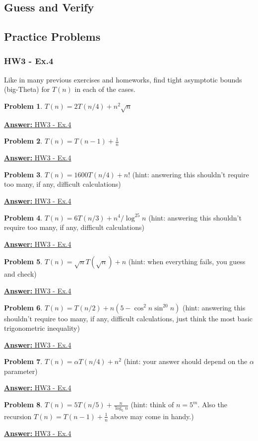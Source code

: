 \documentclass[12pt]{article}
\theoremstyle{definition}
\newtheorem{practiceproblem}{Problem}[section]
\def\scratchwork{\vspace*{15em}} %
\def\ghbase{https://github.com/zacktraczyk/CSE102-Midterm-Study-Guide/blob/main/hw\%20answers/}
\newenvironment{problem}[2]
{
	\def\linktext{#1}
	\def\linkdest{\ghbase#2}
	\noindent \begin{minipage}{\textwidth}
		\begin{practiceproblem}
}
{	
		\end{practiceproblem}
		\scratchwork

		\href{\linkdest}{\textbf{Answer:} \linktext}
	\end{minipage}
}
\def\psetthree{vaggos\_W\_24\_CSE102\_01\_PSET\_3\_Solutions.pdf}
\begin{document}
	\subsection{Guess and Verify}

	\subsection{Practice Problems}

	\subsubsection{HW3 - Ex.4}

	Like in many previous exercises and homeworks, find tight asymptotic bounds
	(big-Theta) for $T(n)$ in each of the cases.

	\begin{problem}{HW3 - Ex.4}{\psetthree}
		$T(n)=2T(n/4)+n^2\sqrt n$
	\end{problem}
	\begin{problem}{HW3 - Ex.4}{\psetthree}
		$T(n)=T(n-1)+\frac1n$
	\end{problem}
	\begin{problem}{HW3 - Ex.4}{\psetthree}
		$T(n)=1600T(n/4)+n!$ (hint: answering this shouldn't require too many,
		if any, difficult calculations)
	\end{problem}
	\begin{problem}{HW3 - Ex.4}{\psetthree}
		$T(n)=6T(n/3)+n^4/\log^{25} n$ (hint: answering this shouldn't require
		too many, if any, difficult calculations)
	\end{problem}
	\begin{problem}{HW3 - Ex.4}{\psetthree}
		$T(n)=\sqrt n T(\sqrt{n}) + n$ (hint: when everything fails, you guess
		and check)
	\end{problem}
	\begin{problem}{HW3 - Ex.4}{\psetthree}
		$T(n)=T(n/2)+n(5-\cos^2n\sin^{20}n)$ (hint: answering this shouldn't
		require too many, if any, difficult calculations, just think the most
		basic trigonometric inequality)
	\end{problem}
	\begin{problem}{HW3 - Ex.4}{\psetthree}
		$T(n)=\alpha T(n/4)+n^2$ (hint: your answer should depend on the
		$\alpha$ parameter)
	\end{problem}
	\begin{problem}{HW3 - Ex.4}{\psetthree}
		$T(n)=5T(n/5) +\frac{n}{\log_5 n}$ (hint: think of $n=5^m$. Also the
		recursion $T(n)=T(n-1)+\frac1n$ above may come in handy.)
	\end{problem}
\end{document}
